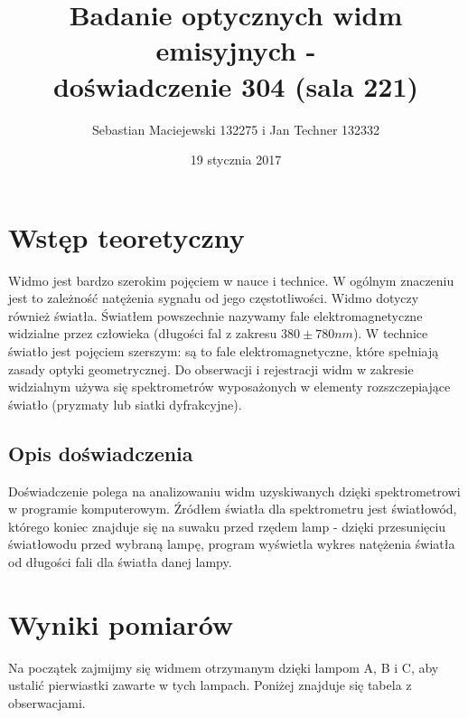 \documentclass[10pt,a4paper]{article}
\author{Sebastian Maciejewski 132275 i Jan Techner 132332}
\title{Badanie optycznych widm emisyjnych - \\ doświadczenie 304 (sala 221)}
\date{19 stycznia 2017}
\newcommand{\forceindent}{\leavevmode{\parindent=3em\indent}}
\begin{document}
\maketitle
\section{Wstęp teoretyczny}
\forceindent Widmo jest bardzo szerokim pojęciem w nauce i technice. W ogólnym znaczeniu jest to zależność natężenia sygnału od jego częstotliwości.
Widmo dotyczy również światła. Światłem powszechnie nazywamy fale elektromagnetyczne widzialne przez człowieka (długości fal z
zakresu $380 \pm 780 nm$). W technice światło jest pojęciem szerszym: są to fale elektromagnetyczne, które spełniają zasady optyki geometrycznej.
Do obserwacji i rejestracji widm w zakresie widzialnym używa się spektrometrów wyposażonych w elementy rozszczepiające światło (pryzmaty lub siatki dyfrakcyjne). 

\subsection*{Opis doświadczenia}
\forceindent Doświadczenie polega na analizowaniu widm uzyskiwanych dzięki spektrometrowi w programie komputerowym. Źródłem światła dla spektrometru
jest światłowód, którego koniec znajduje się na suwaku przed rzędem lamp - dzięki przesunięciu światłowodu przed wybraną lampę, program wyświetla
wykres natężenia światła od długości fali dla światła danej lampy.  

\section{Wyniki pomiarów}

\forceindent Na początek zajmijmy się widmem otrzymanym dzięki lampom A, B i C, aby ustalić pierwiastki zawarte w tych lampach. Poniżej znajduje się tabela z
obserwacjami.
\end{document}
